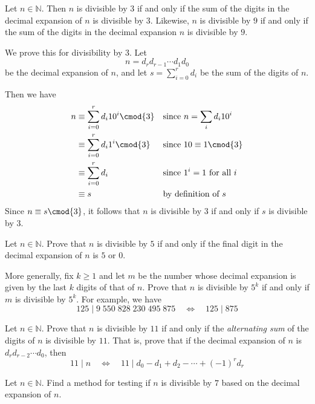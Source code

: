 \begin{example}
Let $n \in \mathbb{N}$. Then $n$ is divisible by $3$ if and only if the sum of the digits in the decimal expansion of $n$ is divisible by $3$. Likewise, $n$ is divisible by $9$ if and only if the sum of the digits in the decimal expansion $n$ is divisible by $9$.

We prove this for divisibility by $3$. Let
\[ n = d_r d_{r-1} \cdots d_1 d_0 \]
be the decimal expansion of $n$, and let $s = \sum_{i=0}^r d_i$ be the sum of the digits of $n$.

Then we have
\begin{align*}
n &\equiv \sum_{i=0}^r d_i 10^i \cmod{3} && \text{since $n=\sum_i d_i 10^i$} \\
&\equiv \sum_{i=0}^r d_i 1^i \cmod{3} && \text{since $10 \equiv 1 \cmod{3}$} \\
&\equiv \sum_{i=0}^r d_i && \text{since $1^i=1$ for all $i$} \\
&\equiv s && \text{by definition of $s$}
\end{align*}
Since $n \equiv s \cmod{3}$, it follows that $n$ is divisible by $3$ if and only if $s$ is divisible by $3$.
\end{example}

\begin{exercise}
Let $n \in \mathbb{N}$. Prove that $n$ is divisible by $5$ if and only if the final digit in the decimal expansion of $n$ is $5$ or $0$.

More generally, fix $k \ge 1$ and let $m$ be the number whose decimal expansion is given by the last $k$ digits of that of $n$. Prove that $n$ is divisible by $5^k$ if and only if $m$ is divisible by $5^k$. For example, we have
\[ 125 \mid 9\;550\;828\;230\;495\;875 \quad \Leftrightarrow \quad 125 \mid 875 \]
\end{exercise}

\begin{exercise}
Let $n \in \mathbb{N}$. Prove that $n$ is divisible by $11$ if and only if the \textit{alternating sum} of the digits of $n$ is divisible by $11$. That is, prove that if the decimal expansion of $n$ is $d_rd_{r-2} \cdots d_0$, then
\[ 11 \mid n \quad \Leftrightarrow \quad 11 \mid d_0 - d_1 + d_2 - \cdots + (-1)^rd_r \]
\end{exercise}

\begin{exercise}
Let $n \in \mathbb{N}$. Find a method for testing if $n$ is divisible by $7$ based on the decimal expansion of $n$.
\end{exercise}

